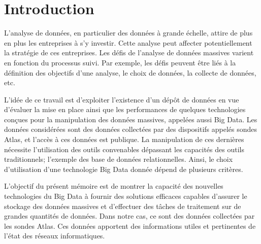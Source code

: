 \chapter*{Introduction}


L'analyse de données, en particulier des données à grande échelle, attire de plus en plus les entreprises à s'y investir.  Cette analyse peut affecter potentiellement la stratégie de ces entreprises. 
Les défis de l'analyse de données massives varient en fonction du processus suivi. Par exemple, les défis peuvent être liés à la définition  des objectifs d'une analyse, le choix de données, la collecte de données, etc.


L'idée de ce travail est  d'exploiter l'existence d'un dépôt de données en vue d'évaluer la mise en place ainsi que les performances de quelques technologies conçues pour la manipulation des données massives, appelées aussi Big Data.
Les données considérées sont des données  collectées par des dispositifs appelés sondes Atlas,  et  l'accès à ces données est publique. 
 La manipulation de ces dernières nécessite l'utilisation des outils convenables dépassant les capacités des outils traditionnels; l'exemple des base de données relationnelles.  Ainsi, le choix d'utilisation d'une technologie Big Data donnée dépend de plusieurs critères. 


L'objectif du présent mémoire est de montrer la capacité des nouvelles technologies du Big Data à fournir des solutions efficaces capables d'assurer le stockage des données massives et d'effectuer des tâches de traitement sur de grandes quantités de données. Dans notre cas, ce sont des données collectées par les sondes Atlas. Ces  données apportent des informations utiles et pertinentes de l'état des réseaux informatiques.


